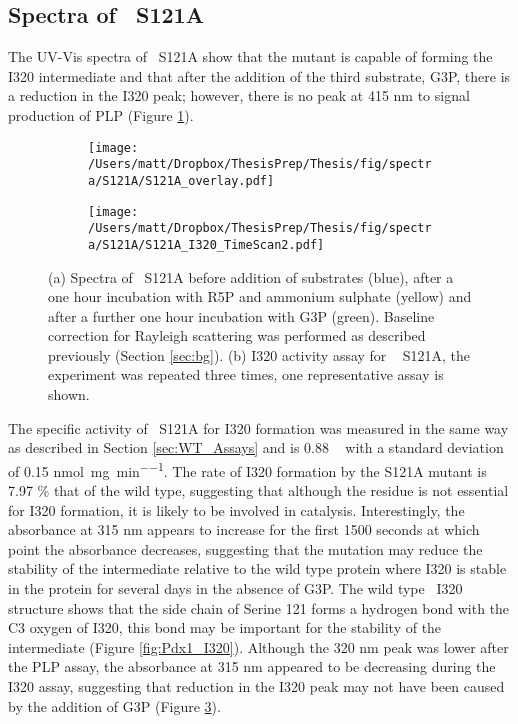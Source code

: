 \subsection*{Spectra of \atpdx ~S121A}
The UV-Vis spectra of \atpdx ~S121A show that the mutant is capable of forming the I320 intermediate and that after the addition of the third substrate, G3P, there is a reduction in the I320 peak; however, there is no peak at 415 nm to signal production of PLP (Figure \ref{fig:pdx1_S121A_spectra}).

\begin{figure}
\centering
\begin{subfigure}{.49\textwidth}
  \centering
  \texttt{[image: /Users/matt/Dropbox/ThesisPrep/Thesis/fig/spectra/S121A/S121A\_overlay.pdf]}	
  \caption{}
  \label{fig:pdx1_S121A_spectra}
\end{subfigure}
\begin{subfigure}{.49\textwidth}
  \centering
  \texttt{[image: /Users/matt/Dropbox/ThesisPrep/Thesis/fig/spectra/S121A/S121A\_I320\_TimeScan2.pdf]}
  \caption{}
  \label{fig:pdx1_S121A_ts_320}
\end{subfigure}

\caption[Spectra of \atpdx ~S121A in solution]{(a) Spectra of \atpdx ~S121A before addition of substrates (blue), after a one hour incubation with R5P and ammonium sulphate (yellow) and after a further one hour incubation with G3P (green). Baseline correction for Rayleigh scattering was performed as described previously (Section \ref{sec:bg}). (b) I320 activity assay for \atpdx~ S121A, the experiment was repeated three times, one representative assay is shown.\label{fig:pdx1_S121A}}
\end{figure}      

The specific activity of \atpdx ~S121A for I320 formation was measured in the same way as described in Section \ref{sec:WT_Assays} and is 0.88 \act~ with a standard deviation of 0.15 \si{\nano\mole\per\milli\gram\per\minute}. The rate of I320 formation by the S121A mutant is 7.97 \% that of the wild type, suggesting that although the residue is not essential for I320 formation, it is likely to be involved in catalysis. Interestingly, the absorbance at 315 nm appears to increase for the first 1500 seconds at which point the absorbance decreases, suggesting that the mutation may reduce the stability of the intermediate relative to the wild type protein where I320 is stable in the protein for several days in the absence of G3P. The wild type \atpdx ~I320 structure shows that the side chain of Serine 121 forms a hydrogen bond with the C3 oxygen of I320, this bond may be important for the stability of the intermediate (Figure \ref{fig:Pdx1_I320}). Although the 320 nm peak was lower after the PLP assay, the absorbance at 315 nm appeared to be decreasing during the I320 assay, suggesting that reduction in the I320 peak may not have been caused by the addition of G3P (Figure \ref{fig:pdx1_S121A}). 

